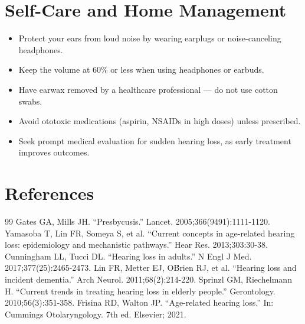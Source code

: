 \section*{Self-Care and Home Management}
\begin{itemize}
  \item Protect your ears from loud noise by wearing earplugs or noise-canceling headphones.
  \item Keep the volume at 60\% or less when using headphones or earbuds.
  \item Have earwax removed by a healthcare professional — do not use cotton swabs.
  \item Avoid ototoxic medications (aspirin, NSAIDs in high doses) unless prescribed.
  \item Seek prompt medical evaluation for sudden hearing loss, as early treatment improves outcomes.
\end{itemize}

\section*{References}
\begin{thebibliography}{99}
 Gates GA, Mills JH. ``Presbycusis.'' Lancet. 2005;366(9491):1111-1120.
 Yamasoba T, Lin FR, Someya S, et al. ``Current concepts in age-related hearing loss: epidemiology and mechanistic pathways.'' Hear Res. 2013;303:30-38.
 Cunningham LL, Tucci DL. ``Hearing loss in adults.'' N Engl J Med. 2017;377(25):2465-2473.
 Lin FR, Metter EJ, O\'Brien RJ, et al. ``Hearing loss and incident dementia.'' Arch Neurol. 2011;68(2):214-220.
 Sprinzl GM, Riechelmann H. ``Current trends in treating hearing loss in elderly people.'' Gerontology. 2010;56(3):351-358.
 Frisina RD, Walton JP. ``Age-related hearing loss.'' In: Cummings Otolaryngology. 7th ed. Elsevier; 2021.
\end{thebibliography}
